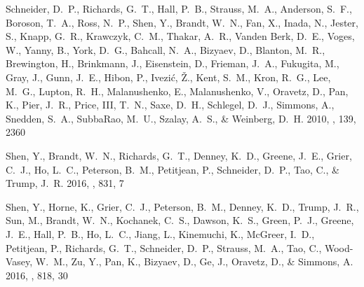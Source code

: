 \documentclass[iop]{emulateapj}
\begin{document}
\begin{thebibliography}{45}
{Schneider}, D.~P., {Richards}, G.~T., {Hall}, P.~B., {Strauss}, M.~A.,
  {Anderson}, S.~F., {Boroson}, T.~A., {Ross}, N.~P., {Shen}, Y., {Brandt},
  W.~N., {Fan}, X., {Inada}, N., {Jester}, S., {Knapp}, G.~R., {Krawczyk},
  C.~M., {Thakar}, A.~R., {Vanden Berk}, D.~E., {Voges}, W., {Yanny}, B.,
  {York}, D.~G., {Bahcall}, N.~A., {Bizyaev}, D., {Blanton}, M.~R.,
  {Brewington}, H., {Brinkmann}, J., {Eisenstein}, D., {Frieman}, J.~A.,
  {Fukugita}, M., {Gray}, J., {Gunn}, J.~E., {Hibon}, P., {Ivezi{\'c}}, {\v
  Z}., {Kent}, S.~M., {Kron}, R.~G., {Lee}, M.~G., {Lupton}, R.~H.,
  {Malanushenko}, E., {Malanushenko}, V., {Oravetz}, D., {Pan}, K., {Pier},
  J.~R., {Price}, III, T.~N., {Saxe}, D.~H., {Schlegel}, D.~J., {Simmons}, A.,
  {Snedden}, S.~A., {SubbaRao}, M.~U., {Szalay}, A.~S., \& {Weinberg}, D.~H.
  2010, \aj, 139, 2360

{Shen}, Y., {Brandt}, W.~N., {Richards}, G.~T., {Denney}, K.~D., {Greene},
  J.~E., {Grier}, C.~J., {Ho}, L.~C., {Peterson}, B.~M., {Petitjean}, P.,
  {Schneider}, D.~P., {Tao}, C., \& {Trump}, J.~R. 2016{}, \apj,
  831, 7

{Shen}, Y., {Horne}, K., {Grier}, C.~J., {Peterson}, B.~M., {Denney}, K.~D.,
  {Trump}, J.~R., {Sun}, M., {Brandt}, W.~N., {Kochanek}, C.~S., {Dawson},
  K.~S., {Green}, P.~J., {Greene}, J.~E., {Hall}, P.~B., {Ho}, L.~C., {Jiang},
  L., {Kinemuchi}, K., {McGreer}, I.~D., {Petitjean}, P., {Richards}, G.~T.,
  {Schneider}, D.~P., {Strauss}, M.~A., {Tao}, C., {Wood-Vasey}, W.~M., {Zu},
  Y., {Pan}, K., {Bizyaev}, D., {Ge}, J., {Oravetz}, D., \& {Simmons}, A.
  2016{}, \apj, 818, 30


\end{thebibliography}
\end{document}
